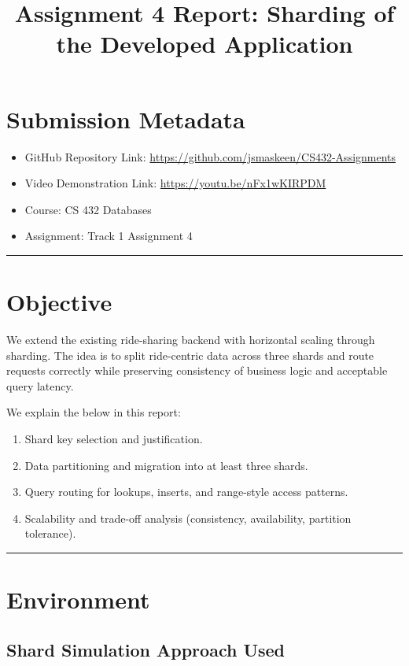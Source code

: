 \documentclass[12pt]{article}
\title{Assignment 4 Report: Sharding of the Developed Application}
\author{}
\date{}
\begin{document}
\maketitle

\section*{Submission Metadata}
\begin{itemize}
    \item GitHub Repository Link: \url{https://github.com/jsmaskeen/CS432-Assignments}
    \item Video Demonstration Link: \url{https://youtu.be/nFx1wKIRPDM}
    \item Course: CS 432 Databases
    \item Assignment: Track 1 Assignment 4
\end{itemize}

\hrule
\vspace{0.75em}

\section{Objective}

We extend the existing ride-sharing backend with horizontal scaling through sharding. The idea is to split ride-centric data across three shards and route requests correctly while preserving consistency of business logic and acceptable query latency.

We explain the below in this report:
\begin{enumerate}
    \item Shard key selection and justification.
    \item Data partitioning and migration into at least three shards.
    \item Query routing for lookups, inserts, and range-style access patterns.
    \item Scalability and trade-off analysis (consistency, availability, partition tolerance).
\end{enumerate}

\hrule
\vspace{0.75em}

\section{Environment}

\subsection{Shard Simulation Approach Used}
\end{document}
